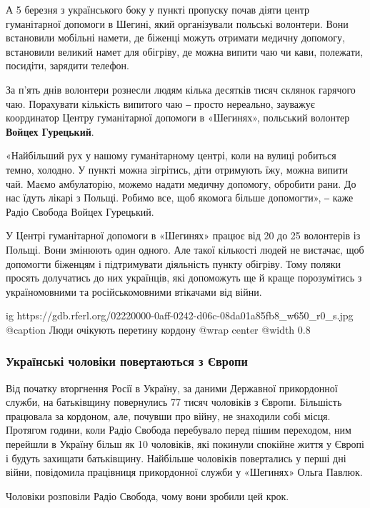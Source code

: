 
А 5 березня з українського боку у пункті пропуску почав діяти центр
гуманітарної допомоги в Шегині, який організували польські волонтери. Вони
встановили мобільні намети, де біженці можуть отримати медичну допомогу,
встановили великий намет для обігріву, де можна випити чаю чи кави, полежати,
посидіти, зарядити телефон.

За п’ять днів волонтери рознесли людям кілька десятків тисяч склянок гарячого
чаю. Порахувати кількість випитого чаю ‒ просто нереально, зауважує координатор
Центру гуманітарної допомоги в «Шегинях», польський волонтер \textbf{Войцех Гурецький}.

«Найбільший рух у нашому гуманітарному центрі, коли на вулиці робиться темно,
холодно. У пункті можна зігрітись, діти отримують їжу, можна випити чай. Маємо
амбулаторію, можемо надати медичну допомогу, обробити рани. До нас їдуть лікарі
з Польщі. Робимо все, щоб якомога більше допомогти», ‒ каже Радіо Свобода
Войцех Гурецький.

У Центрі гуманітарної допомоги в «Шегинях» працює від 20 до 25 волонтерів із
Польщі. Вони змінюють один одного. Але такої кількості людей не вистачає, щоб
допомогти біженцям і підтримувати діяльність пункту обігріву. Тому поляки
просять долучатись до них українців, які допоможуть ще й краще порозумітись з
україномовними та російськомовними втікачами від війни.

\ifcmt
  ig https://gdb.rferl.org/02220000-0aff-0242-d06c-08da01a85fb8_w650_r0_s.jpg
  @caption Люди очікують перетину кордону
  @wrap center
  @width 0.8
\fi

\subsubsection{Українські чоловіки повертаються з Європи}

Від початку вторгнення Росії в Україну, за даними Державної прикордонної
служби, на батьківщину повернулись 77 тисяч чоловіків з Європи. Більшість
працювала за кордоном, але, почувши про війну, не знаходили собі місця.
Протягом години, коли Радіо Свобода перебувало перед пішим переходом, ним
перейшли в Україну більш як 10 чоловіків, які покинули спокійне життя у Європі
і будуть захищати батьківщину. Найбільше чоловіків повертались у перші дні
війни, повідомила працівниця прикордонної служби у «Шегинях» Ольга Павлюк.

Чоловіки розповіли Радіо Свобода, чому вони зробили цей крок.

